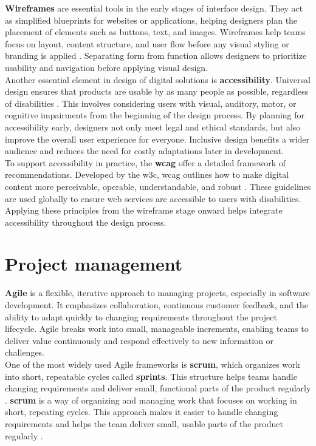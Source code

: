 \textbf{Wireframes} are essential tools in the early stages of interface design. They act as simplified blueprints for websites or applications, helping designers plan the placement of elements such as buttons, text, and images. Wireframes help teams focus on layout, content structure, and user flow before any visual styling or branding is applied \cite{balsamiq:wireframe}. Separating form from function allows designers to prioritize usability and navigation before applying visual design. \\

Another essential element in design of digital solutions is \textbf{accessibility}. Universal design ensures that products are usable by as many people as possible, regardless of disabilities \cite{uutilsynet:universellutforming}. This involves considering users with visual, auditory, motor, or cognitive impairments from the beginning of the design process. By planning for accessibility early, designers not only meet legal and ethical standards, but also improve the overall user experience for everyone. Inclusive design benefits a wider audience and reduces the need for costly adaptations later in development. \\

To support accessibility in practice, the \textbf{\gls{wcag}} offer a detailed framework of recommendations. Developed by the \gls{w3c}, \gls{wcag} outlines how to make digital content more perceivable, operable, understandable, and robust \cite{levelaccess:wcag}. These guidelines are used globally to ensure web services are accessible to users with disabilities. Applying these principles from the wireframe stage onward helps integrate accessibility throughout the design process.

\section{Project management}
\label{sec:project-management}

\textbf{Agile} is a flexible, iterative approach to managing projects, especially in software development. It emphasizes collaboration, continuous customer feedback, and the ability to adapt quickly to changing requirements throughout the project lifecycle. Agile breaks work into small, manageable increments, enabling teams to deliver value continuously and respond effectively to new information or challenges. \\

One of the most widely used Agile frameworks is \textbf{\gls{scrum}}, which organizes work into short, repeatable cycles called \textbf{sprints}. This structure helps teams handle changing requirements and deliver small, functional parts of the product regularly \cite{scrumguides:scrum}. \textbf{\gls{scrum}} is a way of organizing and managing work that focuses on working in short, repeating cycles. This approach makes it easier to handle changing requirements and helps the team deliver small, usable parts of the product regularly \cite{scrumguides:scrum}. \\

